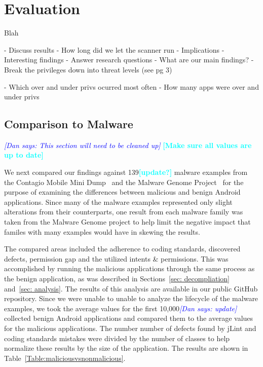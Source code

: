 \documentclass{sig-alternate}
\newcommand{\todo}[1]{\textcolor{cyan}{\textbf{[#1]}}}
\newcommand{\dan}[1]{\textcolor{blue}{{\it [Dan says: #1]}}}
\begin{document}
\label{sec: evaluation}
\section{Evaluation}

Blah


- Discuss results
- How long did we let the scanner run
- Implications
- Interesting findings
- Answer research questions
- What are our main findings?
- Break the privileges down into threat levels (see pg 3)\cite{Felt:2011:EAP:2002168.2002175}


- Which over and under privs ocurred most often
- How many apps were over and under privs




\subsection{Comparison to Malware}

\dan{This section will need to be cleaned up}
\todo{Make sure all values are up to date}

We next compared our findings against 139\todo{update?} malware examples from the Contagio Mobile Mini Dump~\cite{contagio_url} and the Malware Genome Project~\cite{Zhou:2012:DAM:2310656.2310710} for the purpose of examining the differences between malicious and benign Android applications. Since many of the malware examples represented only slight alterations from their counterparts, one result from each malware family was taken from the Malware Genome project to help limit the negative impact that familes with many examples would have in skewing the results.

The compared areas included the adherence to coding standards, discovered defects, permission gap and the utilized intents \& permissions. This was accomplished by running the malicious applications through the same process as the benign application, as was described in Sections~\ref{sec: decompliation} and~\ref{sec: analysis}. The results of this analysis are available in our public GitHub repository. Since we were unable to unable to analyze the lifecycle of the malware examples, we took the average values for the first 10,000\dan{update} collected benign Android applications and compared them to the average values for the malicious applications. The number number of defects found by jLint and coding standards mistakes were divided by the number of classes to help normalize these results by the size of the application. The results are shown in Table~\ref{Table:maliciousvsnonmalicious}.
\end{document}
